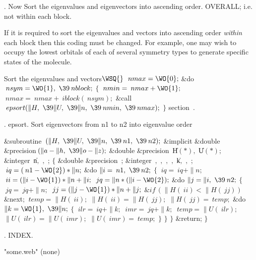 .
Now Sort the eigenvalues and eigenvectors into ascending order.
OVERALL; i.e. not within each block.

If it is required to sort the eigenvalues and vectors into
ascending order {\em within\/} each block then this coding must be
changed. For example, one may wish to occupy the lowest orbitals
of each of several symmetry types to generate specific states of the
molecule.

\WY\WP\4\4Sort the eigenvalues and vectors\X \X${}\WSQ{}$\6
$\>{nmax}=\WO{0};$\6
\&{do} $\>{nsym}=\WO{1},\ \39\>{nblock};$\1\6
$\{$\6
$\>{nmin}=\>{nmax}+\WO{1};$\6
$\>{nmax}=\>{nmax}+\>{iblock}(\>{nsym});$\6
\&{call} $\>{epsort}(\|H,\ \39\|U,\ \39\|n,\ \39\>{nmin},\ \39\>{nmax});$\6
$\}$\2\WY\Wendc
\WU section~.
\fi %

.  epsort.   Sort eigenvectors from n1 to n2 into eigenvalue order

\WY\WP {}%
\&{subroutine}~\1$(\|H,\ \39\|U,\ \39%
\|n,\ \39\>{n1},\ \39\>{n2});$\2\6
\&{implicit} \1\&{double} \&{precision}$\,(\|a-\|h,\ \39\|o-\|z);$\2\6
\&{double} \&{precision}~\1\|H$(\ast),$ \|U$(\ast);$\2\6
\&{integer}~\1\|n$,$ $,$ ;\2\7
$\{$\6
\&{double} \&{precision}~\1;\2\6
\&{integer}~\1$,$ $,$ $,$ $,$ \|k$,$ $,$ %
;\2\7
$\>{iq}=(\>{n1}-\WO{2})\ast\|n;$\6
\&{do} $\|i=\>{n1},\ \39\>{n2};$\1\6
$\{$\6
$\>{iq}=\>{iq}+\|n;$\6
$\>{ii}=(\|i-\WO{1})\ast\|n+\|i;$\6
$\>{jq}=\|n\ast(\|i-\WO{2});$\6
\&{do} $\|j=\|i,\ \39\>{n2};$\1\6
$\{$\6
$\>{jq}=\>{jq}+\|n;$\6
$\>{jj}=(\|j-\WO{1})\ast\|n+\|j;$\6
$\&{if}\,(\|H(\>{ii})<\|H(\>{jj}))$\1\6
\&{next};\2\5
\6
$\>{temp}=\|H(\>{ii});$\6
$\|H(\>{ii})=\|H(\>{jj});$\6
$\|H(\>{jj})=\>{temp};$\6
\&{do} $\|k=\WO{1},\ \39\|n;$\1\6
$\{$\6
$\>{ilr}=\>{iq}+\|k;$\6
$\>{imr}=\>{jq}+\|k;$\6
$\>{temp}=\|U(\>{ilr});$\6
$\|U(\>{ilr})=\|U(\>{imr});$\6
$\|U(\>{imr})=\>{temp};$\6
$\}$\2\6
$\}$\2\6
$\}$\2\6
\&{return};\7
$\}$\WY\Wendc
\fi %

.  INDEX.
\fi %




  {"some.web"} {(none)}
 {\Ratfor}


\FWEBend
